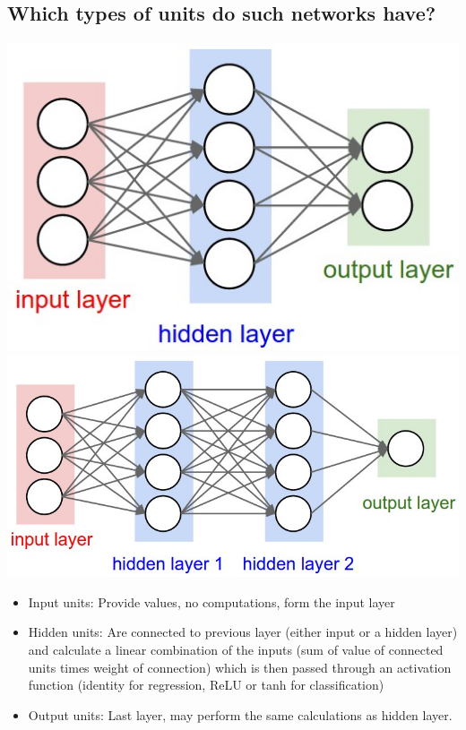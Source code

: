 \subsection{Which types of units do such networks have?}
\begin{minipage}{0.3\textwidth}
\includegraphics[width=\textwidth]{./img/ffnn1.jpeg}
\includegraphics[width=\textwidth]{./img/ffnn2.jpeg}
\end{minipage}
\begin{minipage}{0.7\textwidth}
\begin{itemize}
\item Input units: Provide values, no computations, form the input layer
\item Hidden units: Are connected to previous layer (either input or a hidden layer) and calculate a linear combination of the inputs (sum of value of connected units times weight of connection) which is then passed through an activation function (identity for regression, ReLU or tanh for classification)
\item Output units: Last layer, may perform the same calculations as hidden layer.
\end{itemize}
\end{minipage}
%
